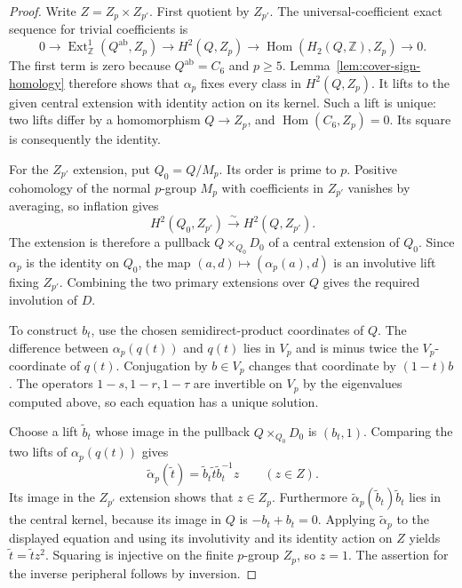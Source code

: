 \begin{proof}
Write $Z=Z_p\times Z_{p'}$. First quotient by $Z_{p'}$.
The universal-coefficient exact sequence for trivial coefficients is
\[
 0\longrightarrow
 \operatorname{Ext}^1_{\mathbb Z}(Q^{\mathrm{ab}},Z_p)
 \longrightarrow H^2(Q,Z_p)
 \longrightarrow\operatorname{Hom}(H_2(Q,\mathbb Z),Z_p)
 \longrightarrow0.
\]
The first term is zero because $Q^{\mathrm{ab}}=C_6$ and $p\geq5$.
Lemma~\ref{lem:cover-sign-homology} therefore shows that
$\alpha_p$ fixes every class in $H^2(Q,Z_p)$. It lifts to the
given central extension with identity action on its kernel.
Such a lift is unique: two lifts differ by a homomorphism
$Q\to Z_p$, and $\operatorname{Hom}(C_6,Z_p)=0$.
Its square is consequently the identity.

For the $Z_{p'}$ extension, put $Q_0=Q/M_p$. Its order is prime to
$p$. Positive cohomology of the normal $p$-group $M_p$ with
coefficients in $Z_{p'}$ vanishes by averaging, so inflation gives
\[
 H^2(Q_0,Z_{p'})\xrightarrow{\ \sim\ }H^2(Q,Z_{p'}).
\]
The extension is therefore a pullback $Q\times_{Q_0}D_0$ of a
central extension of $Q_0$. Since $\alpha_p$ is the identity on
$Q_0$, the map $(a,d)\mapsto(\alpha_p(a),d)$ is an involutive
lift fixing $Z_{p'}$. Combining the two primary extensions over
$Q$ gives the required involution of $D$.

To construct $b_t$, use the chosen semidirect-product coordinates
of $Q$. The difference between $\alpha_p(q(t))$ and $q(t)$ lies
in $V_p$ and is minus twice the $V_p$-coordinate of $q(t)$.
Conjugation by $b\in V_p$ changes that coordinate by $(1-t)b$.
The operators $1-s,1-r,1-\tau$ are invertible on $V_p$ by the
eigenvalues computed above, so each equation has a unique solution.

Choose a lift $\widetilde b_t$ whose image in the pullback
$Q\times_{Q_0}D_0$ is $(b_t,1)$. Comparing the two lifts of
$\alpha_p(q(t))$ gives
\[
 \widetilde\alpha_p(\widetilde t)
   =\widetilde b_t\widetilde t\widetilde b_t^{-1}z
       \qquad(z\in Z).
\]
Its image in the $Z_{p'}$ extension shows that $z\in Z_p$.
Furthermore $\widetilde\alpha_p(\widetilde b_t)\widetilde b_t$
lies in the central kernel, because its image in $Q$ is $-b_t+b_t=0$.
Applying $\widetilde\alpha_p$ to the displayed equation and using
its involutivity and its identity action on $Z$ yields
$\widetilde t=\widetilde t z^2$. Squaring is injective on the
finite $p$-group $Z_p$, so $z=1$. The assertion for the inverse
peripheral follows by inversion.
\end{proof}

